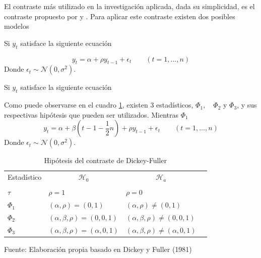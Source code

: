 \documentclass[12pt, twoside]{book}\usepackage[]{graphicx}\usepackage[]{color}
\numberwithin{equation}{section}
\numberwithin{theorem}{section}
\numberwithin{teorema}{section}
\numberwithin{defi}{section}
\numberwithin{prop}{section}
\numberwithin{defi}{section}
\theoremstyle{plain}
\begin{document}
El contraste más utilizado en la investigación aplicada, dada su simplicidad, es el contraste propuesto por \cite{fuller1976} y \cite{dickey1981}. Para aplicar este contraste existen dos posibles modelos 

Si $y_{t}$ satisface la siguiente ecuación

\begin{equation}
y_{t} = \alpha+\rho y_{t-1}+\epsilon_{t}\qquad (t=1,...,n)
\end{equation}
Donde $\epsilon_{t}\sim \mathcal{N}(0,\sigma^{2})$. 

Si $y_{t}$ satisface la siguiente ecuación 

Como puede observarse en el cuadro \ref{tab-1}, existen 3 estadísticos, $\Phi_{1},\quad \Phi_{2}$ y $\Phi_{3}$, y sus respectivas hipótesis que pueden ser utilizados. Mientras $\Phi_{1}$
\begin{equation}
y_{t} = \alpha+\beta\left(t-1-\frac{1}{2}n\right)+\rho y_{t-1}+\epsilon_{t}\qquad (t=1,...,n)
\end{equation}
Donde $\epsilon_{t}\sim \mathcal{N}(0,\sigma^{2})$. 

\begin{table}[h]
\centering
\begin{threeparttable}
\caption{Hipótesis del contraste de Dickey-Fuller}
\begin{tabular}{@{}llrllll@{}}
\toprule
\multicolumn{2}{l}{Estadístico} & \multicolumn{2}{c}{$\mathcal{H}_{0}$} &
\multicolumn{2}{c}{$\mathcal{H}_{a}$} \\
\cmidrule(l){3-4} \cmidrule(l){5-6} \\
\multicolumn{2}{l}{$\tau$} & 
\multicolumn{2}{l}{$\rho =1 $} & 
\multicolumn{2}{l}{$\rho =0 $} \\
\multicolumn{2}{l}{$\Phi_{1}$} &
\multicolumn{2}{l}{$(\alpha,\rho)=(0,1)$} &
\multicolumn{2}{l}{$(\alpha,\rho)\neq(0,1)$} \\
\multicolumn{2}{l}{$\Phi_{2}$} &
\multicolumn{2}{l}{$(\alpha,\beta, \rho)=(0,0,1)$} &
\multicolumn{2}{l}{$(\alpha,\beta,\rho)\neq(0,0,1)$} \\
\multicolumn{2}{l}{$\Phi_{3}$} &
\multicolumn{2}{l}{$(\alpha,\beta, \rho)=(\alpha,0,1)$} &
\multicolumn{2}{l}{$(\alpha,\beta,\rho)\neq(\alpha,0,1)$} \\
\bottomrule
\end{tabular}
\label{tab-1}
\begin{tablenotes}
\small
\item Fuente: Elaboración propia basado en Dickey y Fuller (1981)
\end{tablenotes}
\end{threeparttable}
\end{table}
\end{document}
